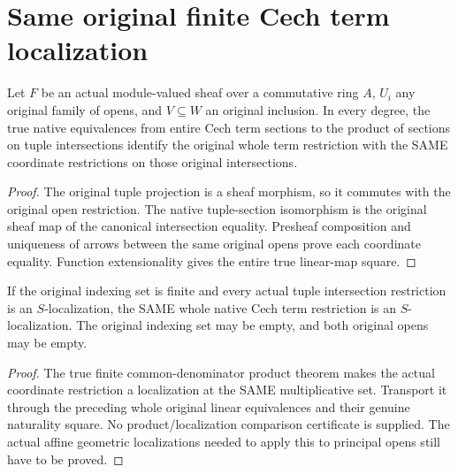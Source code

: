 \section{Same original finite Cech term localization}

\begin{lemma}
\label{lem:sheaf-cech-term-section-restriction}
\leanok
{}
Let $F$ be an actual module-valued sheaf over a commutative
ring $A$, $U_i$ any original family of opens, and
$V\subseteq W$ an original inclusion. In every degree,
the true native equivalences from entire Cech term sections
to the product of sections on tuple intersections identify
the original whole term restriction with the SAME coordinate
restrictions on those original intersections.
\end{lemma}
\begin{proof}
The original tuple projection is a sheaf morphism, so it
commutes with the original open restriction. The native
tuple-section isomorphism is the original sheaf map of the
canonical intersection equality. Presheaf composition and
uniqueness of arrows between the same original opens prove
each coordinate equality. Function extensionality gives the
entire true linear-map square.
\end{proof}

\begin{proposition}
\label{prop:sheaf-finite-cech-term-localization}
\leanok
{}
If the original indexing set is finite and every actual tuple
intersection restriction is an $S$-localization, the SAME
whole native Cech term restriction is an $S$-localization.
The original indexing set may be empty, and both original
opens may be empty.
\end{proposition}
\begin{proof}
The true finite common-denominator product theorem makes the
actual coordinate restriction a localization at the SAME
multiplicative set. Transport it through the preceding
whole original linear equivalences and their genuine
naturality square. No product/localization comparison
certificate is supplied. The actual affine geometric
localizations needed to apply this to principal opens
still have to be proved.
\end{proof}
